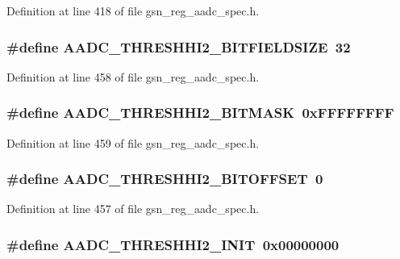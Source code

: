 Definition at line 418 of file gsn\_\-reg\_\-aadc\_\-spec.h.

\hypertarget{a00543_ab0e712409a05d751dc2b60bded214485}{
\subsubsection[{AADC\_\-THRESHHI2\_\-BITFIELDSIZE}]{\setlength{\rightskip}{0pt plus 5cm}\#define AADC\_\-THRESHHI2\_\-BITFIELDSIZE~32}}
\label{a00543_ab0e712409a05d751dc2b60bded214485}


Definition at line 458 of file gsn\_\-reg\_\-aadc\_\-spec.h.

\hypertarget{a00543_ac5f6561a18cc6629e4a754fb23dcef8d}{
\subsubsection[{AADC\_\-THRESHHI2\_\-BITMASK}]{\setlength{\rightskip}{0pt plus 5cm}\#define AADC\_\-THRESHHI2\_\-BITMASK~0xFFFFFFFF}}
\label{a00543_ac5f6561a18cc6629e4a754fb23dcef8d}


Definition at line 459 of file gsn\_\-reg\_\-aadc\_\-spec.h.

\hypertarget{a00543_ae09cc51bf9d7bd6c9a98af7fa007fba5}{
\subsubsection[{AADC\_\-THRESHHI2\_\-BITOFFSET}]{\setlength{\rightskip}{0pt plus 5cm}\#define AADC\_\-THRESHHI2\_\-BITOFFSET~0}}
\label{a00543_ae09cc51bf9d7bd6c9a98af7fa007fba5}


Definition at line 457 of file gsn\_\-reg\_\-aadc\_\-spec.h.

\hypertarget{a00543_a33e40e61b4c4c49465d929d9bdebc1e0}{
\subsubsection[{AADC\_\-THRESHHI2\_\-INIT}]{\setlength{\rightskip}{0pt plus 5cm}\#define AADC\_\-THRESHHI2\_\-INIT~0x00000000}}
\label{a00543_a33e40e61b4c4c49465d929d9bdebc1e0}


